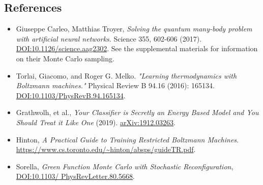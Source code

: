 \documentclass{article}
\begin{document}
\subsection*{References}
\begin{itemize}[itemsep=0.2ex]
\item Giuseppe Carleo, Matthias Troyer, \textit{Solving the quantum many-body problem
with artificial neural networks}. Science 355, 602-606 (2017).
\href{https://doi.org/10.1126/science.aag2302}{DOI:10.1126/science.aag2302}. 
See the supplemental materials for information on their Monte Carlo sampling.
\item Torlai, Giacomo, and Roger G. Melko. \textit{"Learning thermodynamics with
Boltzmann machines."} Physical Review B 94.16 (2016): 165134.
\href{https://doi.org/10.1103/PhysRevB.94.165134}{DOI:10.1103/PhysRevB.94.165134}.
\item Grathwolh, et al., \textit{Your Classifier is Secretly an Energy Based Model and You Should Treat it Like One} (2019).
 \href{https://arxiv.org/abs/1912.03263}{arXiv:1912.03263}.
\item Hinton, \textit{A Practical Guide to Training
Restricted Boltzmann Machines}. \url{https://www.cs.toronto.edu/~hinton/absps/guideTR.pdf}.
\item Sorella, \textit{Green Function Monte Carlo with Stochastic Reconfiguration},
 \href{https://journals.aps.org/prl/abstract/10.1103/PhysRevLett.80.4558}{DOI:10.1103/ PhysRevLetter.80.5668}.
\end{itemize}
\end{document}
